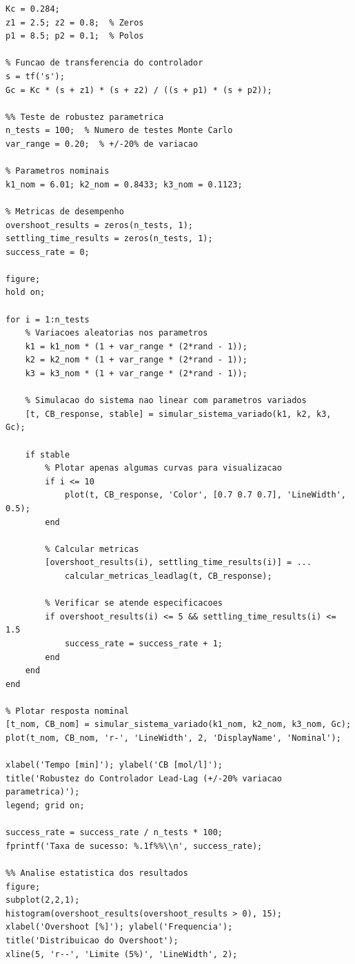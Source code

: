 \documentclass[a4paper,12pt]{article}
\begin{document}
\begin{lstlisting}[caption=Simulacao de robustez - Controlador Lead-Lag]
%% Parametros do controlador Lead-Lag projetado
Kc = 0.284;
z1 = 2.5; z2 = 0.8;  % Zeros
p1 = 8.5; p2 = 0.1;  % Polos

% Funcao de transferencia do controlador
s = tf('s');
Gc = Kc * (s + z1) * (s + z2) / ((s + p1) * (s + p2));

%% Teste de robustez parametrica
n_tests = 100;  % Numero de testes Monte Carlo
var_range = 0.20;  % +/-20% de variacao

% Parametros nominais
k1_nom = 6.01; k2_nom = 0.8433; k3_nom = 0.1123;

% Metricas de desempenho
overshoot_results = zeros(n_tests, 1);
settling_time_results = zeros(n_tests, 1);
success_rate = 0;

figure;
hold on;

for i = 1:n_tests
    % Variacoes aleatorias nos parametros
    k1 = k1_nom * (1 + var_range * (2*rand - 1));
    k2 = k2_nom * (1 + var_range * (2*rand - 1));
    k3 = k3_nom * (1 + var_range * (2*rand - 1));
    
    % Simulacao do sistema nao linear com parametros variados
    [t, CB_response, stable] = simular_sistema_variado(k1, k2, k3, Gc);
    
    if stable
        % Plotar apenas algumas curvas para visualizacao
        if i <= 10
            plot(t, CB_response, 'Color', [0.7 0.7 0.7], 'LineWidth', 0.5);
        end
        
        % Calcular metricas
        [overshoot_results(i), settling_time_results(i)] = ...
            calcular_metricas_leadlag(t, CB_response);
        
        % Verificar se atende especificacoes
        if overshoot_results(i) <= 5 && settling_time_results(i) <= 1.5
            success_rate = success_rate + 1;
        end
    end
end

% Plotar resposta nominal
[t_nom, CB_nom] = simular_sistema_variado(k1_nom, k2_nom, k3_nom, Gc);
plot(t_nom, CB_nom, 'r-', 'LineWidth', 2, 'DisplayName', 'Nominal');

xlabel('Tempo [min]'); ylabel('CB [mol/l]');
title('Robustez do Controlador Lead-Lag (+/-20% variacao parametrica)');
legend; grid on;

success_rate = success_rate / n_tests * 100;
fprintf('Taxa de sucesso: %.1f%%\\n', success_rate);

%% Analise estatistica dos resultados
figure;
subplot(2,2,1);
histogram(overshoot_results(overshoot_results > 0), 15);
xlabel('Overshoot [%]'); ylabel('Frequencia');
title('Distribuicao do Overshoot');
xline(5, 'r--', 'Limite (5%)', 'LineWidth', 2);


\end{lstlisting}
\end{document}
